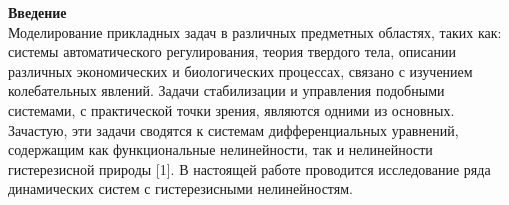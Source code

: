 \vzmscaption

\textbf{Введение}\\
Моделирование прикладных задач в различных предметных областях, таких как: системы автоматического регулирования, теория твердого тела, описании различных экономических и биологических процессах, связано с изучением колебательных явлений. Задачи стабилизации и управления подобными системами, с практической точки зрения, являются одними из основных. Зачастую, эти задачи сводятся к системам дифференциальных уравнений, содержащим как функциональные нелинейности, так и нелинейности гистерезисной природы [1]. В настоящей работе проводится исследование ряда динамических систем с гистерезисными нелинейностям.\\

